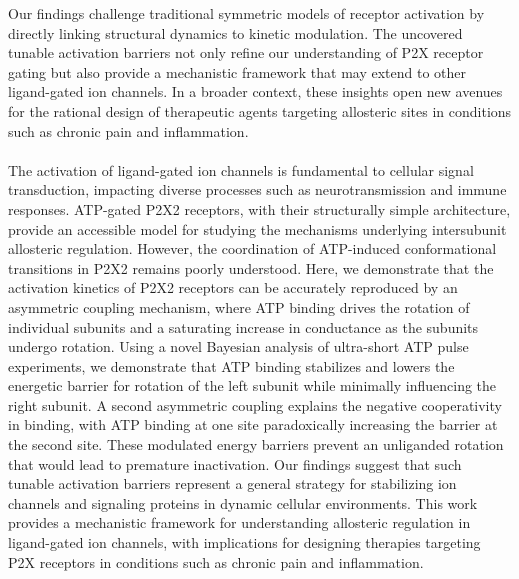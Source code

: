 \documentclass[a4paper,12pt]{article}
\begin{document}
Our findings challenge traditional symmetric models of receptor activation by directly linking structural dynamics to kinetic modulation. The uncovered tunable activation barriers not only refine our understanding of P2X receptor gating but also provide a mechanistic framework that may extend to other ligand-gated ion channels. In a broader context, these insights open new avenues for the rational design of therapeutic agents targeting allosteric sites in conditions such as chronic pain and inflammation.
\\\\	
The activation of ligand-gated ion channels is fundamental to cellular signal transduction, impacting diverse processes such as neurotransmission and immune responses. ATP-gated P2X2 receptors, with their structurally simple architecture, provide an accessible model for studying the mechanisms underlying intersubunit allosteric regulation. However, the coordination of ATP-induced conformational transitions in P2X2 remains poorly understood. Here, we demonstrate that the activation kinetics of P2X2 receptors can be accurately reproduced by an asymmetric coupling mechanism, where ATP binding drives the rotation of individual subunits and a saturating increase in conductance as the subunits undergo rotation. Using a novel Bayesian analysis of ultra-short ATP pulse experiments, we demonstrate that ATP binding stabilizes and lowers the energetic barrier for rotation of the left subunit while minimally influencing the right subunit. A second asymmetric coupling explains the negative cooperativity in binding, with ATP binding at one site paradoxically increasing the barrier at the second site. These modulated energy barriers prevent an unliganded rotation that would lead to premature inactivation. Our findings suggest that such tunable activation barriers represent a general strategy for stabilizing ion channels and signaling proteins in dynamic cellular environments. This work provides a mechanistic framework for understanding allosteric regulation in ligand-gated ion channels, with implications for designing therapies targeting P2X receptors in conditions such as chronic pain and inflammation.




\end{document}
